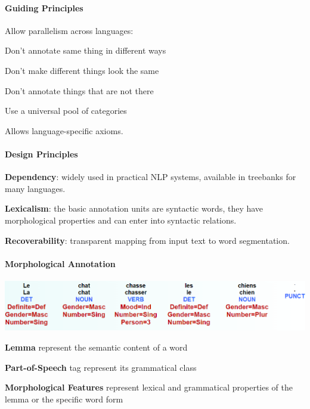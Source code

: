 \documentclass[10pt]{report}
\begin{document}
\paragraph{Guiding Principles} Allow parallelism across languages:
\begin{list}{}{}
	\item Don't annotate same thing in different ways
	\item Don't make different things look the same
	\item Don't annotate things that are not there
	\item Use a universal pool of categories
\end{list}
Allows language-specific axioms.
\paragraph{Design Principles}\begin{list}{}{}
	\item \textbf{Dependency}: widely used in practical NLP systems, available in treebanks for many languages.
	\item \textbf{Lexicalism}: the basic annotation units are syntactic words, they have morphological properties and can enter into syntactic relations.
	\item \textbf{Recoverability}: transparent mapping from input text to word segmentation.
\end{list}
\paragraph{Morphological Annotation} 
\begin{center}
	\includegraphics[scale=0.5]{49.png}
\end{center}
\begin{list}{}{}
	\item \textbf{Lemma} represent the semantic content of a word
	\item \textbf{Part-of-Speech} tag represent its grammatical class
	\item \textbf{Morphological Features} represent lexical and grammatical properties of the lemma or the specific word form
\end{list}
\end{document}
